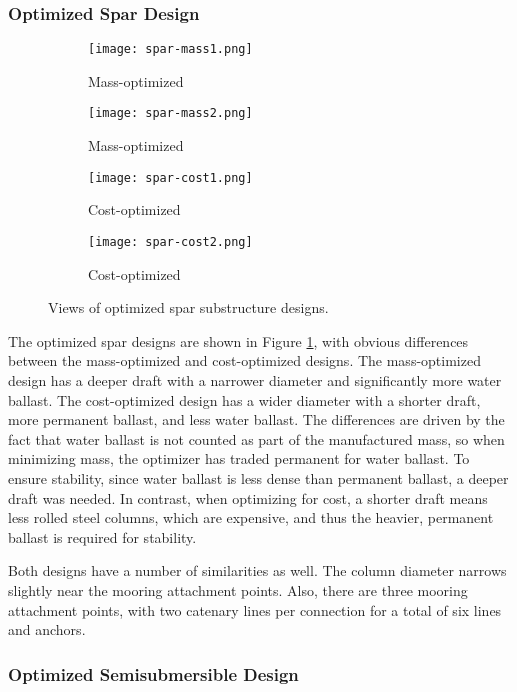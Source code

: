 \subsubsection{Optimized Spar Design}

\begin{figure}[htb]
  \begin{subfigure}[b]{0.24\linewidth}
    \centering \texttt{[image: spar-mass1.png]}
    \caption{Mass-optimized}
  \end{subfigure}
  \begin{subfigure}[b]{0.24\linewidth}
    \centering \texttt{[image: spar-mass2.png]}
    \caption{Mass-optimized}
  \end{subfigure}
  \begin{subfigure}[b]{0.24\linewidth}
    \centering \texttt{[image: spar-cost1.png]}
    \caption{Cost-optimized}
  \end{subfigure}
  \begin{subfigure}[b]{0.24\linewidth}
    \centering \texttt{[image: spar-cost2.png]}
    \caption{Cost-optimized}
  \end{subfigure}
  \caption{Views of optimized spar substructure designs.}
  \label{fig:spar-design}
\end{figure}

The optimized spar designs are shown in Figure \ref{fig:spar-design},
with obvious differences between the mass-optimized and cost-optimized
designs.  The mass-optimized design has a deeper draft with a narrower
diameter and significantly more water ballast.  The cost-optimized
design has a wider diameter with a shorter draft, more permanent
ballast, and less water ballast.  The differences are driven by the fact
that water ballast is not counted as part of the manufactured mass, so
when minimizing mass, the optimizer has traded permanent for water
ballast.  To ensure stability, since water ballast is less dense than
permanent ballast, a deeper draft was needed.  In contrast, when
optimizing for cost, a shorter draft means less rolled steel
columns, which are expensive, and thus the heavier, permanent ballast is
required for stability.

Both designs have a number of similarities as well.  The column diameter
narrows slightly near the mooring attachment points.  Also, there are
three mooring attachment points, with two catenary lines per connection
for a total of six lines and anchors.

\subsubsection{Optimized Semisubmersible Design}

